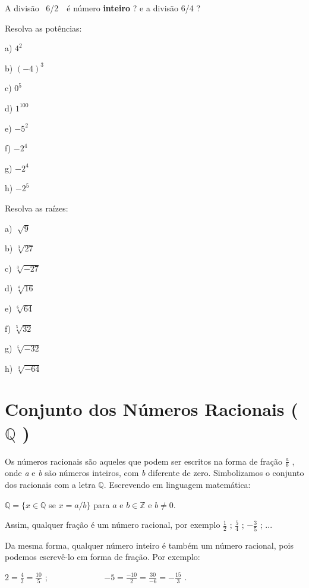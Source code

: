 \begin{exercicios}
	\exitem{} A divisão~ 6/2~~é  número \textbf{inteiro} ? e a divisão 6/4 ?

	\exitem{} Resolva as potências:
	\begin{multicols}{4}
		a) $4^2$
	
		b) $(-4)^3$
	
		c) $0^5$

		d) $1^100$
	
		e) $ -5^{2}$
	
		f) $-2^{4}$

		g) $-2^{4}$

		h)  $-2^{5}$
	\end{multicols}

	\exitem{} Resolva as raízes:
	\begin{multicols}{3}
		a)  \( \sqrt[]{9} \)

		b)  \( \sqrt[3]{27} \)
		
		c)  \( \sqrt[3]{-27} \)
		
		d)  \( \sqrt[4]{16} \)
		
		e)  \( \sqrt[6]{64} \)
		
		f)  \( \sqrt[5]{32} \)
		
		g)  \( \sqrt[5]{-32} \)
		
		h)  \( \sqrt[3]{-64} \)
	\end{multicols}
\end{exercicios}

\section{Conjunto dos Números Racionais ( \( \mathbb{Q} \) )}

Os números racionais são aqueles que podem ser escritos na forma de fração  \( \frac{a}{b} \) , onde \textit{a} e \textit{b} são números inteiros, com \textit{b} diferente de zero. Simbolizamos o conjunto dos racionais com a letra $\mathbb{Q}$. Escrevendo em linguagem matemática:

 $ \mathbb{Q}  =  \{ x \in \mathbb{Q}$ se $x = a/b \} $  para $a$ e $b \in \mathbb{Z} $  e $b \neq 0$.

Assim, qualquer fração é um número racional, por exemplo  \( \frac{1}{2} \)  ;  \( \frac{5}{4} \)  ; \( -\frac{3}{5} \) ; ...

Da mesma forma, qualquer número inteiro é também um número racional, pois podemos escrevê-lo em forma de fração. Por exemplo:

 \( 2=\frac{4}{2}=\frac{10}{5} \) ;~~~~~~~~~~~~~  \( -5=\frac{-10}{2}=\frac{30}{-6}=-\frac{15}{3} \) .

